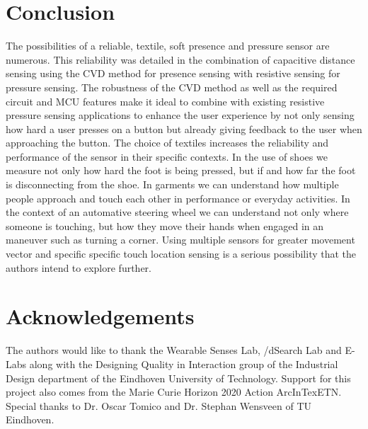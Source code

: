 \documentclass{sigchi-ext}
\begin{document}


\section{Conclusion}
The possibilities of a reliable, textile, soft presence and pressure sensor are
numerous.  This reliability was detailed in the combination of capacitive
distance sensing using the CVD method for presence sensing with resistive
sensing for pressure
sensing. The robustness of the CVD method as well as the required circuit and
MCU features make it ideal to combine with existing resistive
pressure sensing applications to enhance the user experience by not only sensing
how hard a user presses on a button but already giving feedback to the user when
approaching the button. The choice of textiles increases the reliability and
performance of the sensor in their specific contexts. In the use of shoes we
measure not only how hard the foot is being pressed, but if and how far the foot is
disconnecting from the shoe.  In garments we can understand how multiple people
approach and touch each other in performance or everyday activities. In the
context of an automative steering wheel we can understand not only where someone
is touching, but how they move their hands when engaged in an maneuver such as
turning a corner.
 Using multiple sensors for greater movement vector and specific specific
touch location sensing is a serious possibility that the authors intend to
explore further.  

\section{Acknowledgements}
The authors would like to thank the Wearable Senses Lab, /dSearch Lab and E-Labs
along with the Designing Quality in Interaction group of the Industrial Design
department of the Eindhoven University of Technology. Support for this project
also comes from the Marie Curie Horizon 2020 Action ArcInTexETN. Special thanks
to Dr. Oscar Tomico and Dr. Stephan Wensveen of TU Eindhoven.

\balance{} 


\end{document}
